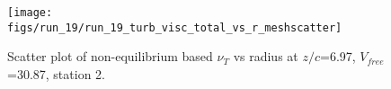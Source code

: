 \begin{figure}[H]
\centering
\texttt{[image: figs/run\_19/run\_19\_turb\_visc\_total\_vs\_r\_meshscatter]}
\caption{Scatter plot of non-equilibrium based $\nu_T$ vs radius at $z/c$=6.97, $V_{free}$=30.87, station 2.}
\label{fig:run_19_turb_visc_total_vs_r_meshscatter}
\end{figure}



